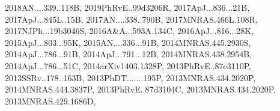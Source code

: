 \documentclass[12pt]{article}
\begin{document}
\begin{enumerate}
\begin{enumerate}
{2018AN....339..118B,%
2019PhRvE..99d3206R,%
2017ApJ...836...21B,%
2017ApJ...845L..15B,%
2017AN....338..790B,%
2017MNRAS.466L.108R,%
2017NJPh...19b3046S,%
2016A&A...593A.134C,%
2016ApJ...816...28K,%
2015ApJ...803...95K,%
2015AN....336...91B,%
2014MNRAS.445.2930S,%
2014ApJ...786...91B,%
2014ApJ...791...12B,%
2014MNRAS.438.2954B,%
2014ApJ...786...51C,%
2014arXiv1403.1328P,%
2013PhRvE..87e3110P,%
2013SSRv..178..163B,%
2013PhDT.......195P,%
2013MNRAS.434.2020P,%
2014MNRAS.444.3837P,%
2013PhRvE..87d3104C,%
2013MNRAS.434.2020P,%
2013MNRAS.429.1686D,%
}
\end{enumerate}
\end{enumerate}
\end{document}
